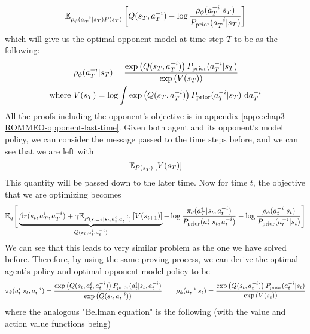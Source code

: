 \begin{equation}
    \mathbb{E}_{ \rho_{\phi}(a^{-i}_T | s_T) P(s_T)}\left[  Q(s_T, a^{-i}_T) - \log \frac{\rho_{\phi}(a^{-i}_T | s_T)}{P_{\text{prior}}(a^{-i}_T | s_T)}  \right]
\end{equation}
which will give us the optimal opponent model at time step $T$ to be as the following:
\begin{equation}
\begin{aligned}
    &\rho_{\phi}(a^{-i}_T | s_T)  = \frac{ \exp\left( Q(s_T, a^{-i}_T) \right)P_{\text{prior}}(a^{-i}_T | s_T) }{\exp\left( V(s_T) \right)}  \\
    \text{where }& V(s_T) = \log \int \exp\left( Q(s_T, a^{-i}_T) \right)P_{\text{prior}}(a^{-i}_T | s_T) \ \mathrm{d} a^{-i}_T
\end{aligned}
\end{equation}
All the proofs including the opponent's objective is in appendix \ref{appx:chap3-ROMMEO-opponent-last-time}. Given both agent and its opponent's model policy, we can consider the message passed to the time steps before, and we can see that we are left with
\begin{equation}
    \mathbb{E}_{P(s_T)}\left[ V(s_T) \right]
\end{equation}
This quantity will be passed down to the later time. Now for time $t$, the objective that we are optimizing becomes 
\begin{equation}
    \mathbb{E}_{q} \Bigg[ \underbrace{\beta r(s_t, a^i_T, a^{-i}_T) + \gamma \mathbb{E}_{P(s_{t+1} | s_t, a^i_t, a^{-i}_t)}  \left[ V(s_{t+1}) \right]}_{Q(s_t, a^i_t, a^{-i}_t)}  - \log \frac{\pi_{\theta}(a^i_T | s_t, a^{-i}_t)}{P_{\text{prior}}(a^i_t | s_t, a^{-i}_t) } - \log \frac{\rho_{\phi}(a^{-i}_t | s_t)}{P_{\text{prior}}(a^{-i}_t | s_t)} \Bigg]
\end{equation}
We can see that this leads to very similar problem as the one we have solved before. Therefore, by using the same proving process, we can derive the optimal agent's policy and optimal opponent model policy to be 
\begin{equation}
\begin{aligned}
    \label{eqn:chap3-final-ROMMEO-policy}
    \pi_{\theta}(a^i_t | s_t, a^{-i}_t) = \frac{\exp \left( Q(s_t, a^i_t, a^{-i}_t) \right)P_{\text{prior}}(a^i_t | s_t, a^{-i}_t) }{\exp\left( Q(s_t, a^{-i}_t) \right)} \quad \quad \rho_{\phi}(a^{-i}_t | s_t) = \frac{ \exp\left( Q(s_t, a^{-i}_t) \right)P_{\text{prior}}(a^{-i}_t | s_t) }{\exp\left( V(s_t) \right)}
\end{aligned}
\end{equation}
where the analogous "Bellman equation" is the following (with the value and action value functions being)
